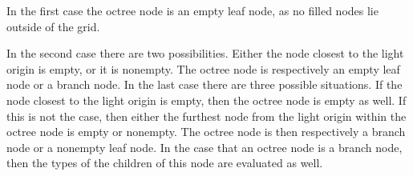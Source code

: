 \noindent In the first case the octree node is an empty leaf node, as no filled nodes lie outside
of the grid.

In the second case there are two possibilities. Either the node closest to the light origin
is empty, or it is nonempty. The octree node is respectively an empty leaf node or a branch node.
In the last case there are three possible situations. If the node closest to the light origin
is empty, then the octree node is empty as well. If this is not the case, then either the furthest
node from the light origin within the octree node is empty or nonempty. The octree node is
then respectively a branch node or a nonempty leaf node. In the case that an octree node is
a branch node, then the types of the children of this node are evaluated as well.








